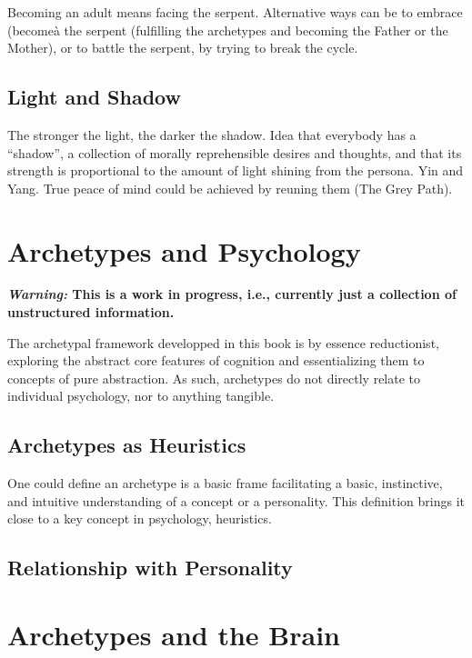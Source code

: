 \documentclass[]{book}
\begin{document}
Becoming an adult means facing the serpent. Alternative ways can be to embrace (becomeà the serpent (fulfilling the archetypes and becoming the Father or the Mother), or to battle the serpent, by trying to break the cycle.

\hypertarget{light-and-shadow}{%
\section{Light and Shadow}\label{light-and-shadow}}

The stronger the light, the darker the shadow.
Idea that everybody has a ``shadow'', a collection of morally reprehensible desires and thoughts, and that its strength is proportional to the amount of light shining from the persona. Yin and Yang. True peace of mind could be achieved by reuning them (The Grey Path).

\hypertarget{archetypes-and-psychology}{%
\chapter{Archetypes and Psychology}\label{archetypes-and-psychology}}

\textbf{\emph{Warning:} This is a work in progress, i.e., currently just a collection of unstructured information.}

The archetypal framework developped in this book is by essence reductionist, exploring the abstract core features of cognition and essentializing them to concepts of pure abstraction. As such, archetypes do not directly relate to individual psychology, nor to anything tangible.

\hypertarget{archetypes-as-heuristics}{%
\section{Archetypes as Heuristics}\label{archetypes-as-heuristics}}

One could define an archetype is a basic frame facilitating a basic, instinctive, and intuitive understanding of a concept or a personality. This definition brings it close to a key concept in psychology, heuristics.

\hypertarget{relationship-with-personality}{%
\section{Relationship with Personality}\label{relationship-with-personality}}

\hypertarget{archetypes-and-the-brain}{%
\chapter{Archetypes and the Brain}\label{archetypes-and-the-brain}}
\end{document}

